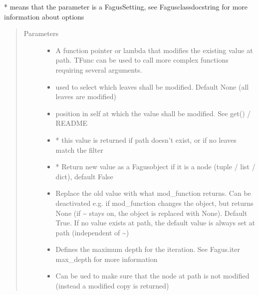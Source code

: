\documentclass[a4paper,10pt,english]{sphinxmanual}
\begin{document}
\begin{fulllineitems}
\begin{fulllineitems}
\sphinxAtStartPar
* means that the parameter is a Fagus\sphinxhyphen{}Setting, see Fagus\sphinxhyphen{}class\sphinxhyphen{}docstring for more information about options
\begin{quote}\begin{description}
\item[{Parameters}] \leavevmode\begin{itemize}
\item {}
\sphinxAtStartPar
{} \textendash{} A function pointer or lambda that modifies the existing value at path. TFunc can be used to
call more complex functions requiring several arguments.

\item {}
\sphinxAtStartPar
{} \textendash{} used to select which leaves shall be modified. Default None (all leaves are modified)

\item {}
\sphinxAtStartPar
{} \textendash{} position in self at which the value shall be modified. See get() / README

\item {}
\sphinxAtStartPar
{} \textendash{} * this value is returned if path doesn’t exist, or if no leaves match the filter

\item {}
\sphinxAtStartPar
{} \textendash{} * Return new value as a Fagus\sphinxhyphen{}object if it is a node (tuple / list / dict), default False

\item {}
\sphinxAtStartPar
{} \textendash{} Replace the old value with what mod\_function returns. Can be deactivated e.g. if mod\_function
changes the object, but returns None (if \textasciitilde{} stays on, the object is replaced with None). Default True.
If no value exists at path, the default value is always set at path (independent of \textasciitilde{})

\item {}
\sphinxAtStartPar
{} \textendash{} Defines the maximum depth for the iteration. See Fagus.iter max\_depth for more information

\item {}
\sphinxAtStartPar
{} \textendash{} Can be ued to make sure that the node at path is not modified (instead a modified copy is returned)


\end{itemize}
\end{description}
\end{quote}
\end{fulllineitems}
\end{fulllineitems}
\end{document}
